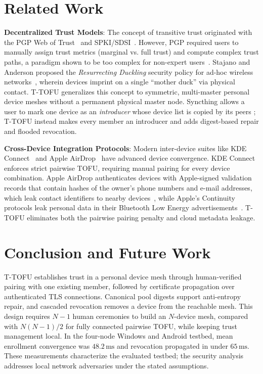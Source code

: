 \documentclass[conference,a4paper]{IEEEtran}
\begin{document}
\section{Related Work}
\textbf{Decentralized Trust Models}: The concept of transitive trust originated with the PGP Web of Trust~\cite{zimmermann1995official} and SPKI/SDSI~\cite{rfc2693}. However, PGP required users to manually assign trust metrics (marginal vs. full trust) and compute complex trust paths, a paradigm shown to be too complex for non-expert users~\cite{whitten1999johnny}. Stajano and Anderson proposed the \textit{Resurrecting Duckling} security policy for ad-hoc wireless networks~\cite{stajano2000duckling}, wherein devices imprint on a single ``mother duck'' via physical contact. T-TOFU generalizes this concept to symmetric, multi-master personal device meshes without a permanent physical master node. Syncthing allows a user to mark one device as an \textit{introducer} whose device list is copied by its peers \cite{syncthingintroducer}; T-TOFU instead makes every member an introducer and adds digest-based repair and flooded revocation.

\textbf{Cross-Device Integration Protocols}: Modern inter-device suites like KDE Connect~\cite{kdeconnect} and Apple AirDrop~\cite{heinrich2021privatedrop} have advanced device convergence. KDE Connect enforces strict pairwise TOFU, requiring manual pairing for every device combination. Apple AirDrop authenticates devices with Apple-signed validation records that contain hashes of the owner's phone numbers and e-mail addresses, which leak contact identifiers to nearby devices~\cite{heinrich2021privatedrop}, while Apple's Continuity protocols leak personal data in their Bluetooth Low Energy advertisements~\cite{celosia2020discontinued}. T-TOFU eliminates both the pairwise pairing penalty and cloud metadata leakage.

\section{Conclusion and Future Work}
T-TOFU establishes trust in a personal device mesh through human-verified pairing with one existing member, followed by certificate propagation over authenticated TLS connections. Canonical pool digests support anti-entropy repair, and cascaded revocation removes a device from the reachable mesh. This design requires $N-1$ human ceremonies to build an $N$-device mesh, compared with $N(N-1)/2$ for fully connected pairwise TOFU, while keeping trust management local. In the four-node Windows and Android testbed, mean enrollment convergence was $48.2\,\text{ms}$ and revocation propagated in under $65\,\text{ms}$. These measurements characterize the evaluated testbed; the security analysis addresses local network adversaries under the stated assumptions.
\end{document}
